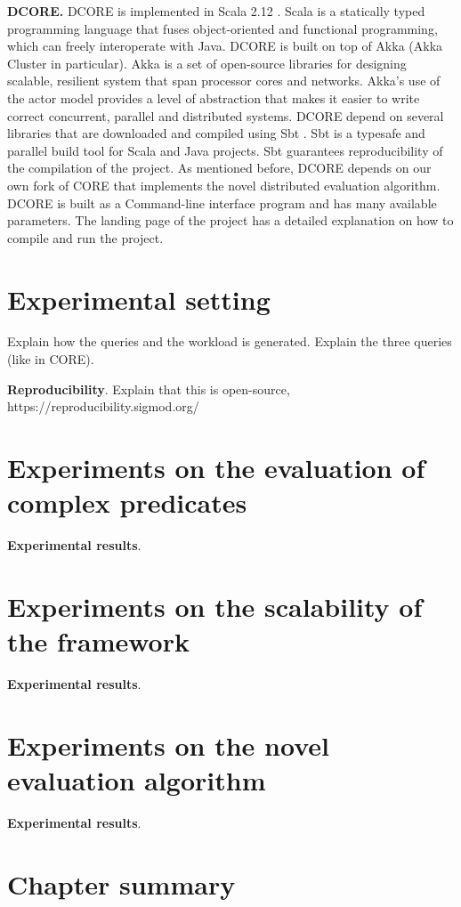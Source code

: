 \textbf{DCORE.} DCORE is implemented in Scala 2.12 \cite{scala}. Scala \cite{scala} is a statically typed programming language that fuses object-oriented and functional programming, which can freely interoperate with Java. DCORE is built on top of Akka \cite{akka} (Akka Cluster in particular). Akka is a set of open-source libraries for designing scalable, resilient system that span processor cores and networks. Akka’s use of the actor model provides a level of abstraction that makes it easier to write correct concurrent, parallel and distributed systems. DCORE depend on several libraries that are downloaded and compiled using Sbt \cite{sbt}. Sbt is a typesafe and parallel build tool for Scala and Java projects. Sbt guarantees reproducibility of the compilation of the project. As mentioned before, DCORE depends on our own fork of CORE that implements the novel distributed evaluation algorithm. DCORE is built as a Command-line interface program and has many available parameters. The landing page of the project has a detailed explanation on how to compile and run the project.



\section{Experimental setting}\label{sec:setup}


Explain how the queries and the workload is generated. Explain the three queries (like in CORE).

\textbf{Reproducibility}. Explain that this is open-source, https://reproducibility.sigmod.org/

\section{Experiments on the evaluation of complex predicates}\label{sec:predicates}

\textbf{Experimental results}.

\section{Experiments on the scalability of the framework}\label{sec:scalability}

\textbf{Experimental results}.

\section{Experiments on the novel evaluation algorithm}\label{sec:new-algorithm}

\textbf{Experimental results}.

\section{Chapter summary}
